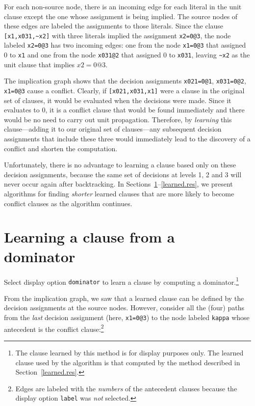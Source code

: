 \documentclass[11pt]{article}
\newcommand*{\p}[1]{\textup{\texttt{#1}}}
\begin{document}
For each non-source node, there is an incoming edge for each literal in
the unit clause except the one whose assignment is being implied.
The source nodes of these edges are labeled the assignments to those
literals. Since the clause \verb+[x1,x031,~x2]+ with three literals
implied the assignment \p{x2=0@3}, the node labeled \p{x2=0@3} has
two incoming edges: one from the node \p{x1=0@3} that assigned 0 to
\p{x1} and one from the node \p{x031@2} that assigned 0 to \p{x031},
leaving \verb+~x2+ as the unit clause that implies $x2=0@3$.

The implication graph shows that the decision assignments \p{x021=0@1},
\p{x031=0@2}, \p{x1=0@3} cause a conflict. Clearly, if
\verb+[x021,x031,x1]+ were a clause in the original set of clauses, it
would be evaluated when the decisions were made. Since it evaluates to
0, it is a conflict clause that would be found immediately and there
would be no need to carry out unit propagation. Therefore, by
\emph{learning} this clause---adding it to our original set of
clauses---any subsequent decision assignments that include these three
would immediately lead to the discovery of a conflict and shorten the
computation.

Unfortunately, there is no advantage to learning a clause based only on
these decision assignments, because the same set of decisions at levels
1, 2 and 3 will never occur again after backtracking. In
Sections~\ref{learned.dom}--\ref{learned.res}, we present algorithms for
finding \emph{shorter} learned clauses that are more likely to become
conflict clauses as the algorithm continues.


\newpage

\section{Learning a clause from a dominator}\label{learned.dom}

Select display option \p{dominator} to learn a clause by computing a
dominator.\footnote{The clause learned by this method is for display purposes
only. The learned clause used by the algorithm is that computed by the
method described in Section~\ref{learned.res}.} 

From the implication graph, we saw that a learned clause can be defined
by the decision assignments at the source nodes. However, consider all
the (four) paths from the \emph{last} decision assignment (here,
\p{x1=0@3}) to the node labeled \p{kappa} whose antecedent is the
conflict clause:\footnote{Edges are labeled with the \emph{numbers} of
the antecedent clauses because the display option \p{label} was
\emph{not} selected.}
\end{document}
